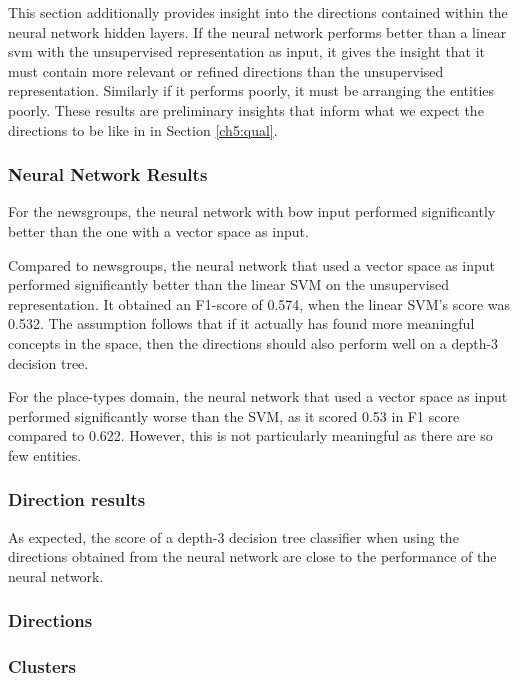 This section additionally provides insight into the directions contained within the neural network hidden layers.  If the neural network performs better than a linear svm with the unsupervised representation as input, it gives the insight that it must contain more relevant or refined directions than the unsupervised representation. Similarly if it performs poorly, it must be arranging the entities poorly. These results are preliminary insights that inform what we expect the directions to be like in in Section \ref{ch5:qual}.

\subsubsection{Neural Network Results}

For the newsgroups, the neural network with bow input performed significantly better than the one with a vector space as input. 

Compared to newsgroups, the neural network that used a vector space as input performed significantly better than the linear SVM on the unsupervised representation. It obtained an F1-score of 0.574, when the linear SVM's score was 0.532. The assumption follows that if it actually has found more meaningful concepts in the space, then the directions should also perform well on a depth-3 decision tree.

For the place-types domain, the neural network that used a vector space as input performed significantly worse than the SVM, as it scored 0.53 in F1 score compared to 0.622. However, this is not particularly meaningful as there are so few entities.

\subsubsection{Direction results}

As expected, the score of a depth-3  decision tree classifier when using the directions obtained from the neural network are close to the performance of the neural network. 







\subsubsection{Directions}


\subsubsection{Clusters}


